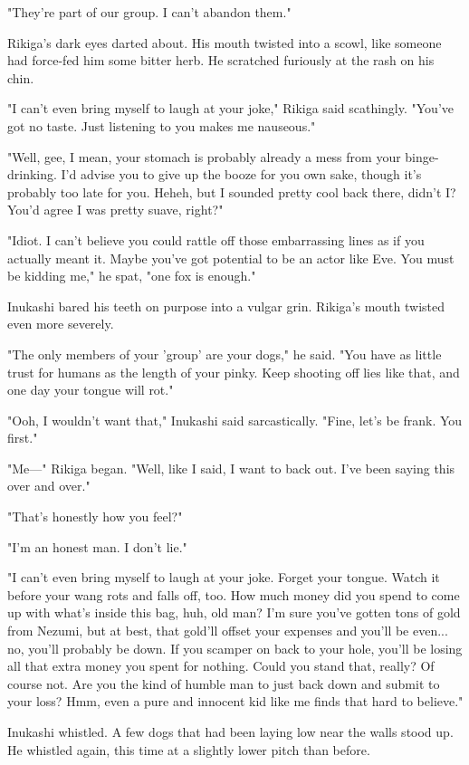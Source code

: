 "They're part of our group. I can't abandon them."

Rikiga's dark eyes darted about. His mouth twisted into a scowl, like
someone had force-fed him some bitter herb. He scratched furiously at
the rash on his chin.

"I can't even bring myself to laugh at your joke," Rikiga said
scathingly. "You've got no taste. Just listening to you makes me
nauseous."

"Well, gee, I mean, your stomach is probably already a mess from your
binge-drinking. I'd advise you to give up the booze for you own sake,
though it's probably too late for you. Heheh, but I sounded pretty cool
back there, didn't I? You'd agree I was pretty suave, right?"

"Idiot. I can't believe you could rattle off those embarrassing lines as
if you actually meant it. Maybe you've got potential to be an actor like
Eve. You must be kidding me," he spat, "one fox is enough."

Inukashi bared his teeth on purpose into a vulgar grin. Rikiga's mouth
twisted even more severely.

"The only members of your 'group' are your dogs," he said. "You have as
little trust for humans as the length of your pinky. Keep shooting off
lies like that, and one day your tongue will rot."

"Ooh, I wouldn't want that," Inukashi said sarcastically. "Fine, let's
be frank. You first."

"Me---" Rikiga began. "Well, like I said, I want to back out. I've been
saying this over and over."

"That's honestly how you feel?"

"I'm an honest man. I don't lie."

"I can't even bring myself to laugh at your joke. Forget your tongue.
Watch it before your wang rots and falls off, too. How much money did
you spend to come up with what's inside this bag, huh, old man? I'm sure
you've gotten tons of gold from Nezumi, but at best, that gold'll offset
your expenses and you'll be even... no, you'll probably be down. If you
scamper on back to your hole, you'll be losing all that extra money you
spent for nothing. Could you stand that, really? Of course not. Are you
the kind of humble man to just back down and submit to your loss? Hmm,
even a pure and innocent kid like me finds that hard to believe."

Inukashi whistled. A few dogs that had been laying low near the walls
stood up. He whistled again, this time at a slightly lower pitch than
before.

